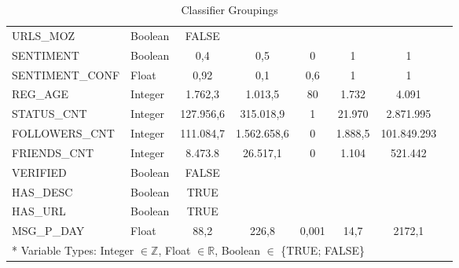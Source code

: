 \begin{appendices}
\begin{table}[H]
\begin{center}
{\begin{tabular}{l| lcccccc}
						URLS\_MOZ					& Boolean & FALSE 	  & 			 & 		 & 		   & 			\\
						SENTIMENT					& Boolean & 0,4 	  & 0,5 		 & 0 	 & 1 	   & 1			\\
						SENTIMENT\_CONF				& Float   & 0,92 	  & 0,1 		 & 0,6 	 & 1 	   & 1 			\\
						\hline
						REG\_AGE 					& Integer & 1.762,3   & 1.013,5 	 & 80 	 & 1.732   & 4.091		\\
						STATUS\_CNT 				& Integer & 127.956,6 & 315.018,9    & 1 	 & 21.970  & 2.871.995	\\ 
						FOLLOWERS\_CNT 				& Integer & 111.084,7 & 1.562.658,6  & 0 	 & 1.888,5 & 101.849.293\\ 
						FRIENDS\_CNT				& Integer & 8.473.8   & 26.517,1 	 & 0 	 & 1.104   & 521.442	\\
						VERIFIED					& Boolean & FALSE 	  & 			 & 		 & 		   & 			\\ 
						HAS\_DESC 					& Boolean & TRUE 	  & 			 & 		 & 		   & 			\\ 
						HAS\_URL					& Boolean & TRUE 	  & 			 & 		 & 		   & 			\\ 
						MSG\_P\_DAY 				& Float   & 88,2	  & 226,8 	 	 & 0,001 & 14,7	   & 2172,1		\\ 
						\hline\hline
						\multicolumn{6}{l}{* Variable Types: Integer $ \in \mathbb{Z} $, Float $ \in \mathbb{R} $, Boolean $ \in  $ \{TRUE; FALSE\} }
					\end{tabular}
				}	
			\end{center}
			\caption[Classifier Groupings]{Classifier Groupings}
		\end{table}

	
\end{appendices}